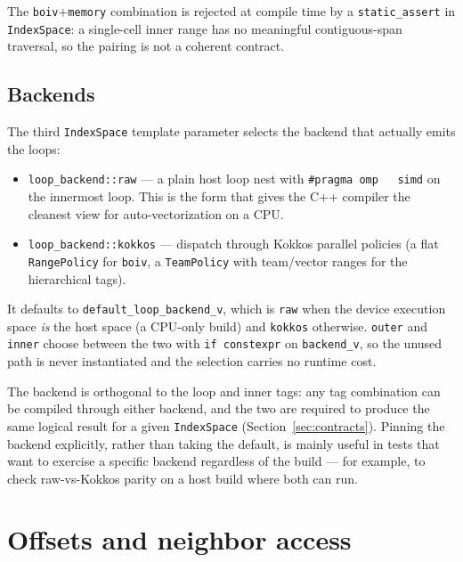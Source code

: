 \documentclass[11pt]{article}
\newcommand{\code}[1]{\lstinline[basicstyle=\ttfamily]|#1|}
\begin{document}
The \code{boiv}${+}$\code{memory} combination is rejected at compile time by a
\code{static_assert} in \code{IndexSpace}: a single-cell inner range has no
meaningful contiguous-span traversal, so the pairing is not a coherent contract.

\subsection{Backends}
\label{sec:backends}

The third \code{IndexSpace} template parameter selects the backend that actually
emits the loops:
\begin{itemize}
\item \code{loop_backend::raw} --- a plain host loop nest with \code{#pragma omp
  simd} on the innermost loop. This is the form that gives the C++ compiler the
  cleanest view for auto-vectorization on a CPU.
\item \code{loop_backend::kokkos} --- dispatch through Kokkos parallel policies
  (a flat \code{RangePolicy} for \code{boiv}, a \code{TeamPolicy} with team/vector
  ranges for the hierarchical tags).
\end{itemize}
It defaults to \code{default_loop_backend_v}, which is \code{raw} when the device
execution space \emph{is} the host space (a CPU-only build) and \code{kokkos}
otherwise. \code{outer} and \code{inner} choose between the two with
\code{if constexpr} on \code{backend_v}, so the unused path is never instantiated
and the selection carries no runtime cost.

The backend is orthogonal to the loop and inner tags: any tag combination can be
compiled through either backend, and the two are required to produce the same
logical result for a given \code{IndexSpace} (Section~\ref{sec:contracts}).
Pinning the backend explicitly, rather than taking the default, is mainly useful
in tests that want to exercise a specific backend regardless of the build --- for
example, to check raw-vs-Kokkos parity on a host build where both can run.

\section{Offsets and neighbor access}
\label{sec:getdelta}
\end{document}
